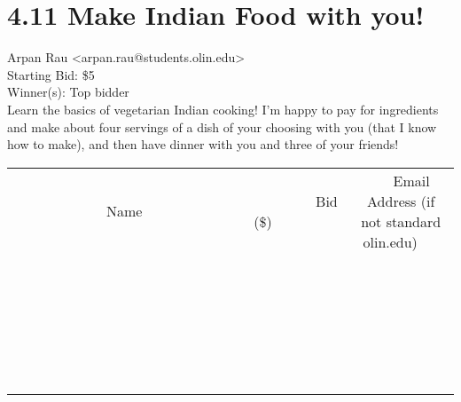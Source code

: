 \documentclass[11pt]{article}
\begin{document}
					\section*{4.11 Make Indian Food with you!}
					Arpan Rau <arpan.rau@students.olin.edu> \\
					Starting Bid: \$5 \\
					Winner(s): Top bidder \\
					Learn the basics of vegetarian Indian cooking! I'm happy to pay for ingredients and make about four servings of a dish of your choosing with you (that I know how to make), and then have dinner with you and three of your friends! \\
					[6ex]
					\begin{tabular}{c c c}
						~~~~~~~~~~~~~Name~~~~~~~~~~~~~ & ~~~~~~~~~Bid (\$)~~~~~~~~~ & ~~~Email Address (if not standard olin.edu)~~~ \\
				
 & & \\
\hline
 & & \\
\hline
 & & \\
\hline
 & & \\
\hline
 & & \\
\hline
 & & \\
\hline
 & & \\
\hline
 & & \\
\hline
 & & \\
\hline
 & & \\
\hline
 & & \\
\hline
 & & \\
\hline
 & & \\
\hline
 & & \\
\hline
 & & \\
\hline
 & & \\
\hline
 & & \\
\hline
 & & \\
\hline
 & & \\
\hline
 & & \\
\hline
 & & \\
\hline
 & & \\
\hline
 & & \\
\hline
 & & \\
\hline
 & & \\
\hline
 & & \\
\hline
					\end{tabular}
					\clearpage
				
\end{document}
